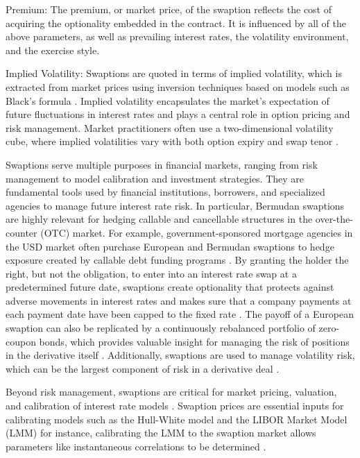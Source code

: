 Premium: The premium, or market price, of the swaption reflects the cost of acquiring the optionality embedded in the contract. It is influenced by all of the above parameters, as well as prevailing interest rates, the volatility environment, and the exercise style.

Implied Volatility: Swaptions are quoted in terms of implied volatility, which is extracted from market prices using inversion techniques based on models such as Black’s formula \parencite[p.~3]{hohmann2015newnormal}. Implied volatility encapsulates the market’s expectation of future fluctuations in interest rates and plays a central role in option pricing and risk management. Market practitioners often use a two-dimensional volatility cube, where implied volatilities vary with both option expiry and swap tenor \parencite[p.~1]{suo2009volatility}.

Swaptions serve multiple purposes in financial markets, ranging from risk management to model calibration and investment strategies. They are fundamental tools used by financial institutions, borrowers, and specialized agencies to manage future interest rate risk. In particular, Bermudan swaptions are highly relevant for hedging callable and cancellable structures in the over-the-counter (OTC) market. For example, government-sponsored mortgage agencies in the USD market often purchase European and Bermudan swaptions to hedge exposure created by callable debt funding programs \parencite[p.~22]{rebonato2004interest}. By granting the holder the right, but not the obligation, to enter into an interest rate swap at a predetermined future date, swaptions create optionality that protects against adverse movements in interest rates and makes sure that a company payments at each payment date have been capped to the fixed rate \parencite[p.~17]{brigo2006interest}. The payoff of a European swaption can also be replicated by a continuously rebalanced portfolio of zero-coupon bonds, which provides valuable insight for managing the risk of positions in the derivative itself \parencite[p.~241]{brigo2006interest}. Additionally, swaptions are used to manage volatility risk, which can be the largest component of risk in a derivative deal \parencite[p.~242]{brigo2006interest}.

Beyond risk management, swaptions are critical for market pricing, valuation, and calibration of interest rate models \parencite[pp.~132--136]{brigo2006interest}.  Swaption prices are essential inputs for calibrating models such as the Hull-White model \parencite{kladivko2023mlehullwhite} and the LIBOR Market Model (LMM)  for instance, calibrating the LMM to the swaption market allows parameters like instantaneous correlations to be determined \parencite[p.~290]{brigo2006interest}.

